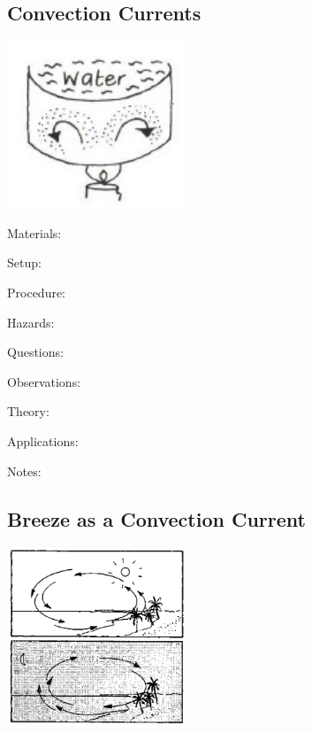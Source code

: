 \begin{multicols}{2}
\subsection{Convection Currents}

\begin{center}
\includegraphics[width=0.4\textwidth]{./img/vso/convection-currents.png}
\end{center}

\begin{description*}
\item[Materials:]{}
\item[Setup:]{}
\item[Procedure:]{}
\item[Hazards:]{}
\item[Questions:]{}
\item[Observations:]{}
\item[Theory:]{}
\item[Applications:]{}
\item[Notes:]{}
\end{description*}

\subsection{Breeze as a Convection Current}

\begin{center}
\includegraphics[width=0.4\textwidth]{./img/source/breeze.png}
\end{center}


\end{multicols}
